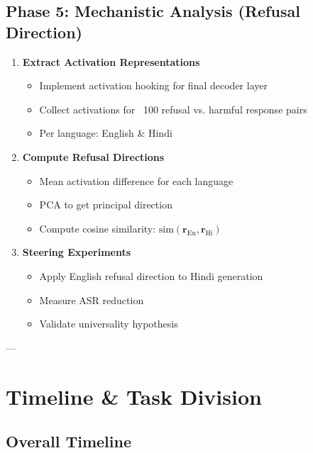 \documentclass[11pt,a4paper]{article}
\begin{document}
\subsection{Phase 5: Mechanistic Analysis (Refusal Direction)}

\begin{enumerate}
    \item[\textcolor{pending}{▶}] \textbf{Extract Activation Representations}
    \begin{itemize}
        \item Implement activation hooking for final decoder layer
        \item Collect activations for ~100 refusal vs. harmful response pairs
        \item Per language: English \& Hindi
    \end{itemize}

    \item[\textcolor{pending}{▶}] \textbf{Compute Refusal Directions}
    \begin{itemize}
        \item Mean activation difference for each language
        \item PCA to get principal direction
        \item Compute cosine similarity: $\text{sim}(\mathbf{r}_{\text{En}}, \mathbf{r}_{\text{Hi}})$
    \end{itemize}

    \item[\textcolor{pending}{▶}] \textbf{Steering Experiments}
    \begin{itemize}
        \item Apply English refusal direction to Hindi generation
        \item Measure ASR reduction
        \item Validate universality hypothesis
    \end{itemize}
\end{enumerate}

---

\section{Timeline \& Task Division}

\subsection{Overall Timeline}
\end{document}
